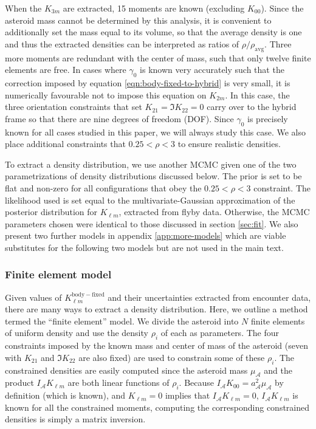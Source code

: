 \documentclass[fleqn,usenatbib]{mnras}
\begin{document}
When the $K_{3m}$ are extracted, 15 moments are known (excluding $K_{00}$). Since the asteroid mass cannot be determined by this analysis, it is convenient to additionally set the mass equal to its volume, so that the average density is one and thus the extracted densities can be interpreted as ratios of $\rho / \rho_\text{avg}$. Three more moments are redundant with the center of mass, such that only twelve finite elements are free. In cases where $\gamma_0$ is known very accurately such that the correction imposed by equation \ref{eqn:body-fixed-to-hybrid} is very small, it is numerically favourable not to impose this equation on $K_{2m}$. In this case, the three orientation constraints that set $K_{21}=\Im K_{22} = 0$ carry over to the hybrid frame so that there are nine degrees of freedom (DOF). Since $\gamma_0$ is precisely known for all cases studied in this paper, we will always study this case. We also place additional constraints that $0.25 < \rho < 3$ to ensure realistic densities.

To extract a density distribution, we use another MCMC given one of the two parametrizations of density distributions discussed below. The prior is set to be flat and non-zero for all configurations that obey the $0.25 < \rho < 3$ constraint. The likelihood used is set equal to the multivariate-Gaussian approximation of the posterior distribution for $K_{\ell m}$, extracted from flyby data. Otherwise, the MCMC parameters chosen were identical to those discussed in section \ref{sec:fit}. We also present two further models in appendix \ref{app:more-models} which are viable substitutes for the following two models but are not used in the main text.



\subsubsection{Finite element model}

Given values of $K_{\ell m}^\mathrm{body-fixed}$ and their uncertainties extracted from encounter data, there are many ways to extract a density distribution. Here, we outline a method termed the ``finite element'' model. We divide the asteroid into $N$ finite elements of uniform density and use the density $\rho_i$ of each as parameters. The four constraints imposed by the known mass and center of mass of the asteroid (seven with $K_{21}$ and $\Im K_{22}$ are also fixed) are used to constrain some of these $\rho_i$. The constrained densities are easily computed since the asteroid mass $\mu_\mathcal{A}$ and the product $I_\mathcal{A}K_{\ell m}$ are both linear functions of $\rho_i$. Because $I_\mathcal{A}K_{00} = a_\mathcal{A}^2\mu_\mathcal{A}$ by definition (which is known), and $K_{\ell m} = 0$ implies that $I_\mathcal{A}K_{\ell m} = 0$, $I_\mathcal{A} K_{\ell m}$ is known for all the constrained moments, computing the corresponding constrained densities is simply a matrix inversion.
\end{document}
